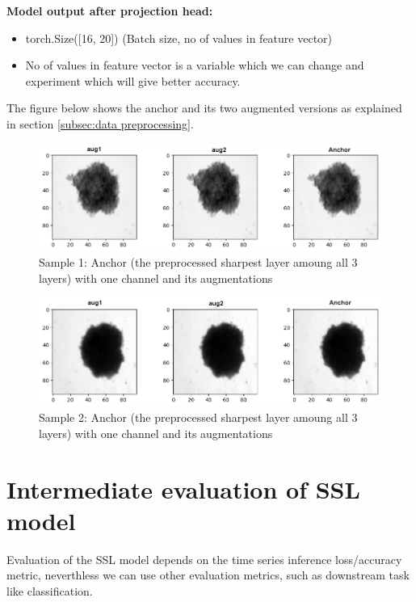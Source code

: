 \documentclass[12pt,twoside,a4paper,parskip]{scrbook} %
\begin{document}
\textbf{Model output after projection head:}
\begin{itemize}
  \item torch.Size([16, 20])  (Batch size, no of values in feature vector)  
  \item No of values in feature vector is a variable which we can change and experiment which will give better accuracy.
\end{itemize}

The figure below shows the anchor and its two augmented versions as explained in section \ref{subsec:data preprocessing}.
\begin{figure}[H]
  \centering
  \includegraphics[width=0.9\linewidth]{figures/1_1.png} %
  \caption{Sample 1: Anchor (the preprocessed sharpest layer amoung all 3 layers) with one channel and its augmentations}
  \label{fig:1doutput1}
\end{figure}

\begin{figure}[H]
  \centering
  \includegraphics[width=0.9\linewidth]{figures/1_2.png} %
  \caption{Sample 2: Anchor (the preprocessed sharpest layer amoung all 3 layers) with one channel and its augmentations}
  \label{fig:1doutput3}
\end{figure}

\section{Intermediate evaluation of SSL model}
Evaluation of the SSL model depends on the  time series inference loss/accuracy metric, neverthless we can use other evaluation metrics, such as downstream task like classification. 
\end{document}
